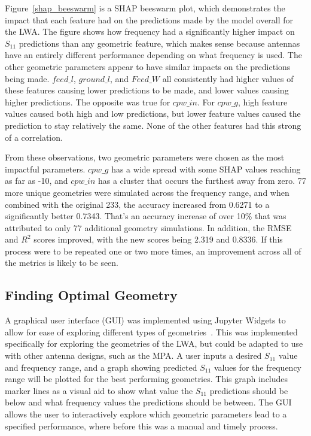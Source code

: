 \documentclass[conference]{IEEEtran}
\begin{document}
Figure~\ref{shap_beeswarm} is a SHAP beeswarm plot, which demonstrates the impact that each feature had on the predictions made by the model overall for the LWA. The figure shows how frequency had a significantly higher impact on $S_{11}$ predictions than any geometric feature, which makes sense because antennas have an entirely different performance depending on what frequency is used. The other geometric parameters appear to have similar impacts on the predictions being made. $feed\_l$, $ground\_l$, and $Feed\_W$ all consistently had higher values of these features causing lower predictions to be made, and lower values causing higher predictions. The opposite was true for $cpw\_in$. For $cpw\_g$, high feature values caused both high and low predictions, but lower feature values caused the prediction to stay relatively the same. None of the other features had this strong of a correlation. 

From these observations, two geometric parameters were chosen as the most impactful parameters. $cpw\_g$ has a wide spread with some SHAP values reaching as far as -10, and $cpw\_in$ has a cluster that occurs the furthest away from zero. 77 more unique geometries were simulated across the frequency range, and when combined with the original 233, the accuracy increased from 0.6271 to a significantly better 0.7343. That's an accuracy increase of over 10\% that was attributed to only 77 additional geometry simulations. In addition, the RMSE and $R^2$ scores improved, with the new scores being 2.319 and 0.8336. If this process were to be repeated one or two more times, an improvement across all of the metrics is likely to be seen. 


\subsection{Finding Optimal Geometry}
A graphical user interface (GUI) was implemented using Jupyter Widgets to allow for ease of exploring different types of geometries~\cite{interactive_Jupyter_widgets}. This was implemented specifically for exploring the geometries of the LWA, but could be adapted to use with other antenna designs, such as the MPA. A user inputs a desired $S_{11}$ value and frequency range, and a graph showing predicted $S_{11}$ values for the frequency range will be plotted for the best performing geometries. This graph includes marker lines as a visual aid to show what value the $S_{11}$ predictions should be below and what frequency values the predictions should be between. The GUI allows the user to interactively explore which geometric parameters lead to a specified performance, where before this was a manual and timely process.  
\end{document}
